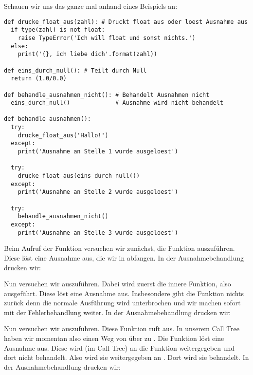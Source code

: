 Schauen wir uns das ganze mal anhand eines Beispiels an:
\begin{lstlisting}
def drucke_float_aus(zahl): # Druckt float aus oder loest Ausnahme aus
  if type(zahl) is not float:
    raise TypeError('Ich will float und sonst nichts.')
  else:
    print('{}, ich liebe dich'.format(zahl))

def eins_durch_null(): # Teilt durch Null
  return (1.0/0.0)

def behandle_ausnahmen_nicht(): # Behandelt Ausnahmen nicht
  eins_durch_null()             # Ausnahme wird nicht behandelt

def behandle_ausnahmen():
  try:
    drucke_float_aus('Hallo!')
  except:
    print('Ausnahme an Stelle 1 wurde ausgeloest')
  
  try:
    drucke_float_aus(eins_durch_null())
  except:
    print('Ausnahme an Stelle 2 wurde ausgeloest')
  
  try:
    behandle_ausnahmen_nicht()
  except:
    print('Ausnahme an Stelle 3 wurde ausgeloest')
\end{lstlisting}
Beim Aufruf der Funktion  versuchen wir zunächst, die Funktion  auszuführen.
Diese löst eine Ausnahme aus, die wir in  abfangen.
In der Ausnahmebehandlung drucken wir:
\begin{center}
\end{center}
Nun versuchen wir  auszuführen.
Dabei wird zuerst die innere Funktion, also  ausgeführt.
Diese löst eine Ausnahme aus.
Insbesondere gibt die Funktion  nichts zurück denn die normale Ausführung wird unterbrochen und wir machen sofort mit der Fehlerbehandlung weiter.
In der Ausnahmebehandlung drucken wir:
\begin{center}
\end{center}
Nun versuchen wir  auszuführen.
Diese Funktion ruft  aus.
In unserem Call Tree haben wir momentan also einen Weg von  über  zu .
Die Funktion  löst eine Ausnahme aus.
Diese wird (im Call Tree) an die Funktion  weitergegeben und dort nicht behandelt.
Also wird sie weitergegeben an .
Dort wird sie behandelt.
In der Ausnahmebehandlung drucken wir:
\begin{center}
\end{center}
